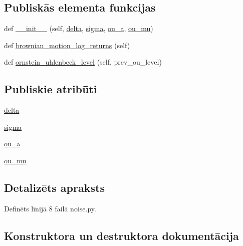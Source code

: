 \subsection*{Publiskās elementa funkcijas}
\begin{DoxyCompactItemize}
\item 
def \hyperlink{classnoise_1_1_o_u_noise_a4c250d049db8708e66241e37a2910101}{\+\_\+\+\_\+init\+\_\+\+\_\+} (self, \hyperlink{classnoise_1_1_o_u_noise_a0d32976eef71e3899eeff4d04ec50544}{delta}, \hyperlink{classnoise_1_1_o_u_noise_ae47f26b40c75e9039ceef58859dccc90}{sigma}, \hyperlink{classnoise_1_1_o_u_noise_aff4bb3aa350f605b987d90e72499afd9}{ou\+\_\+a}, \hyperlink{classnoise_1_1_o_u_noise_ae5746606ef8e0c123814e782535c5b09}{ou\+\_\+mu})
\item 
def \hyperlink{classnoise_1_1_o_u_noise_a18a594f4c39c884806b50078df4a2063}{brownian\+\_\+motion\+\_\+log\+\_\+returns} (self)
\item 
def \hyperlink{classnoise_1_1_o_u_noise_a4b01fc4f19ee3f17cffe91290312cc97}{ornstein\+\_\+uhlenbeck\+\_\+level} (self, prev\+\_\+ou\+\_\+level)
\end{DoxyCompactItemize}
\subsection*{Publiskie atribūti}
\begin{DoxyCompactItemize}
\item 
\hyperlink{classnoise_1_1_o_u_noise_a0d32976eef71e3899eeff4d04ec50544}{delta}
\item 
\hyperlink{classnoise_1_1_o_u_noise_ae47f26b40c75e9039ceef58859dccc90}{sigma}
\item 
\hyperlink{classnoise_1_1_o_u_noise_aff4bb3aa350f605b987d90e72499afd9}{ou\+\_\+a}
\item 
\hyperlink{classnoise_1_1_o_u_noise_ae5746606ef8e0c123814e782535c5b09}{ou\+\_\+mu}
\end{DoxyCompactItemize}


\subsection{Detalizēts apraksts}


Definēts līnijā 8 failā noise.\+py.



\subsection{Konstruktora un destruktora dokumentācija}

